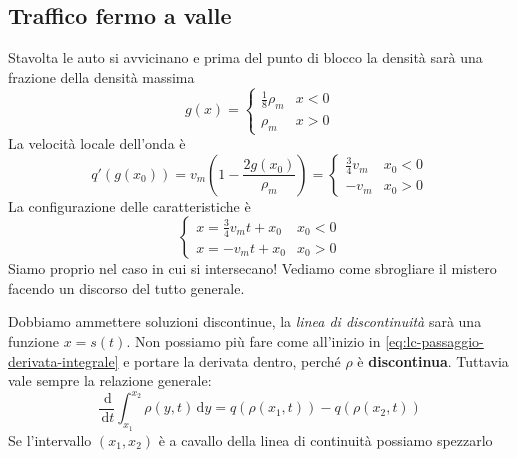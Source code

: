 \documentclass[10pt,a4paper,twoside,openright]{book}
\newcommand{\de}{\,\mathrm d}
\newcommand{\dy}{\de y}
\newcommand{\dt}{\de t}
\begin{document}
\subsection{Traffico fermo a valle}

Stavolta le auto si avvicinano e prima del punto di blocco la densità sarà una frazione della densità massima
\begin{equation*}
	g(x) =
	\begin{cases}
		\frac{1}{8} \rho _{m} & x< 0 \\
		\rho _{m}             & x >0 
	\end{cases}
\end{equation*}
La velocità locale dell'onda è
\begin{equation*}
	q'(g(x_{0})) =v_{m}\left(1-\frac{2g(x_{0})}{\rho _{m}}\right) =
	\begin{cases}
		\frac{3}{4} v_{m} & x_{0} < 0 \\
		-v_{m}            & x_{0}  >0 
	\end{cases}
\end{equation*}
La configurazione delle caratteristiche è
\begin{equation*}
	\begin{cases}
		x=\frac{3}{4} v_{m} t+x_{0} & x_{0} < 0 \\
		x=-v_{m} t+x_{0}            & x_{0}  >0 
	\end{cases}
\end{equation*}
Siamo proprio nel caso in cui si intersecano! Vediamo come sbrogliare il mistero facendo un discorso del tutto generale.


Dobbiamo ammettere soluzioni discontinue, la \textit{linea di discontinuità} sarà una funzione $x=s(t)$. Non possiamo più fare come all'inizio in \eqref{eq:lc-passaggio-derivata-integrale} e portare la derivata dentro, perché $\rho $ è \textbf{discontinua}. Tuttavia vale sempre la relazione generale:
\begin{equation*}
	\frac{\de}{\dt}\int ^{x_{2}}_{x_{1}} \rho (y,t) \dy=q(\rho (x_{1} ,t)) -q(\rho (x_{2} ,t))
\end{equation*}
Se l'intervallo $(x_{1} ,x_{2})$ è a cavallo della linea di continuità possiamo spezzarlo
\end{document}
